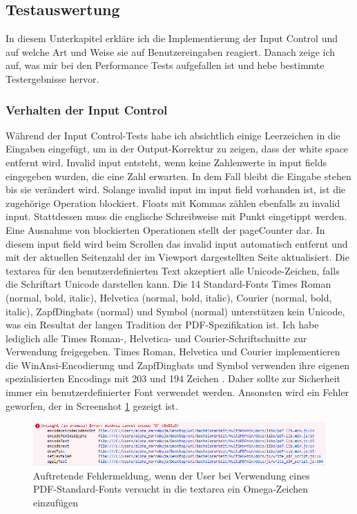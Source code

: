 \subsection{Testauswertung}
In diesem Unterkapitel erkläre ich die Implementierung der Input Control und auf welche Art und Weise sie auf Benutzereingaben reagiert. Danach zeige ich auf, was mir bei den Performance Tests aufgefallen ist und hebe bestimmte Testergebnisse hervor.

\subsubsection{Verhalten der Input Control}
Während der Input Control-Tests habe ich absichtlich einige Leerzeichen in die Eingaben eingefügt, um in der Output-Korrektur zu zeigen, dass der white space entfernt wird. Invalid input entsteht, wenn keine Zahlenwerte in input fields eingegeben wurden, die eine Zahl erwarten. In dem Fall bleibt die Eingabe stehen bis sie verändert wird. Solange invalid input im input field vorhanden ist, ist die zugehörige Operation blockiert. Floats mit Kommas zählen ebenfalls zu invalid input. Stattdessen muss die englische Schreibweise mit Punkt eingetippt werden. Eine Ausnahme von blockierten Operationen stellt der pageCounter dar. In diesem input field wird beim Scrollen das invalid input automatisch entfernt und mit der aktuellen Seitenzahl der im Viewport dargestellten Seite aktualisiert. Die textarea für den benutzerdefinierten Text akzeptiert alle Unicode-Zeichen, falls die Schriftart Unicode darstellen kann. Die 14 Standard-Fonts Times Roman (normal, bold, italic), Helvetica (normal, bold, italic), Courier (normal, bold, italic), ZapfDingbats (normal) und Symbol (normal) unterstützen kein Unicode, was ein Resultat der langen Tradition der PDF-Spezifikation ist. Ich habe lediglich alle Times Roman-, Helvetica- und Courier-Schriftschnitte zur Verwendung freigegeben. Times Roman, Helvetica und Courier implementieren die WinAnsi-Encodierung und ZapfDingbats und Symbol verwenden ihre eigenen spezialisierten Encodings mit 203 und 194 Zeichen \cite{pdf-lib}. Daher sollte zur Sicherheit immer ein benutzerdefinierter Font verwendet werden. Ansonsten wird ein Fehler geworfen, der in Screenshot \ref{fig:font-error} gezeigt ist.

\begin{figure}[!htbp]
	\centering
	\includegraphics[width=1\textwidth]{"images/font-error.png"}
	\caption{Auftretende Fehlermeldung, wenn der User bei Verwendung eines PDF-Standard-Fonts versucht in die textarea ein Omega-Zeichen einzufügen}
	\label{fig:font-error}
\end{figure}

